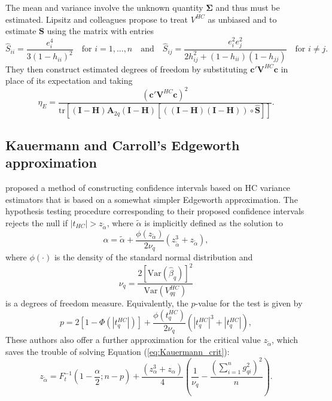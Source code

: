 \documentclass[12pt]{article}\usepackage[]{graphicx}\usepackage[]{color}
\newcommand{\Var}{\text{Var}}
\newcommand{\tr}{\text{tr}}
\newcommand{\bm}{\mathbf}
\newcommand{\bs}{\boldsymbol}
\begin{document}
The mean and variance involve the unknown quantity $\bs\Sigma$ and thus must be estimated. Lipsitz and colleagues propose to treat $V^{HC}$ as unbiased and to estimate $\bm{S}$ using the matrix with entries \[
\hat{S}_{ii} = \frac{e_i^4}{3(1 - h_{ii})^2} \quad \text{for } i = 1,...,n \quad \text{and} \quad \hat{S}_{ij} = \frac{e_i^2 e_j^2}{2 h_{ij}^2 + (1 - h_{ii})(1 - h_{jj})} \quad \text{for } i \neq j. \]
They then construct estimated degrees of freedom by substituting $\bm{c}'\bm{V}^{HC} \bm{c}$ in place of its expectation and taking 
\begin{equation}
\label{eq:nu_empirical}
\eta_E = \frac{\left(\bm{c}'\bm{V}^{HC}\bm{c}\right)^2}{\tr\left[\left(\bm{I} - \bm{H}\right)\bm{A}_{2q} \left(\bm{I} - \bm{H}\right)\left[\left(\left(\bm{I} - \bm{H}\right)\left(\bm{I} - \bm{H}\right)\right)\circ \bm{\hat{S}}\right]\right]}.
\end{equation}



\subsection{Kauermann and Carroll's Edgeworth approximation}

\citet{Kauermann2001note} proposed a method of constructing confidence intervals based on HC variance estimators that is based on a somewhat simpler Edgeworth approximation. The hypothesis testing procedure corresponding to their proposed confidence intervals rejects the null if $\left|t_{HC} \right| > z_{\tilde\alpha}$, where $\tilde\alpha$ is implicitly defined as the solution to \begin{equation}
\label{eq:Kauermann_crit}
\alpha = \tilde\alpha + \frac{\phi\left(z_{\tilde\alpha}\right)}{2 \nu_q}\left(z_{\tilde\alpha}^3 + z_{\tilde\alpha}\right), 
\end{equation}
where $\phi(\cdot)$ is the density of the standard normal distribution and \[
\nu_q  = \frac{2 \left[\Var(\hat\beta_q)\right]^2}{\Var\left(V^{HC}_{qq}\right)}\] 
is a degrees of freedom measure. Equivalently, the $p$-value for the test is given by \[
p = 2 \left[1 - \Phi\left(|t^{HC}_q|\right)\right] + \frac{\phi\left(t^{HC}_q\right)}{2 \nu_q}\left(\left|t^{HC}_q\right|^3 + \left|t^{HC}_q\right|\right), \]
These authors also offer a further approximation for the critical value $z_{\tilde\alpha}$, which saves the trouble of solving Equation (\ref{eq:Kauermann_crit}):
\[
z_{\tilde\alpha} = F_t^{-1}\left(1 - \frac{\alpha}{2}; n - p\right) + \frac{\left(z_\alpha^3 + z_\alpha\right)}{4}\left(\frac{1}{\nu_q} - \frac{\left(\sum_{i=1}^n g_{qi}^2\right)^2}{n}\right). \]
\end{document}
